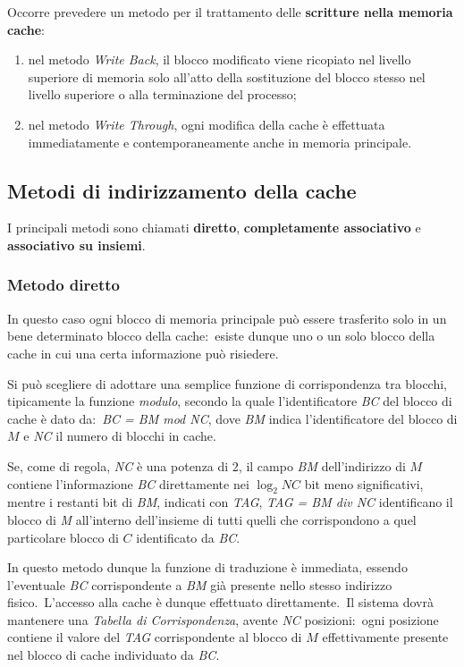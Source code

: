 Occorre prevedere un metodo per il trattamento delle \textbf{scritture nella memoria cache}:

\begin{enumerate}
    \item nel metodo\textit{ Write Back}, il blocco modificato viene ricopiato nel livello superiore di memoria solo all'atto della sostituzione del blocco stesso nel livello superiore o alla terminazione del processo;
    \item nel metodo \textit{Write Through}, ogni modifica della cache è effettuata immediatamente e contemporaneamente anche in memoria principale.
\end{enumerate}

\subsection{Metodi di indirizzamento della cache}

I principali metodi sono chiamati \textbf{diretto}, \textbf{completamente associativo} e \textbf{associativo su insiemi}.

\subsubsection{Metodo diretto}

In questo caso ogni blocco di memoria principale può essere trasferito solo in un bene determinato blocco della cache:\ esiste dunque uno o un solo blocco della cache in cui una certa informazione può risiedere.

Si può scegliere di adottare una semplice funzione di corrispondenza tra blocchi, tipicamente la funzione \textit{modulo}, secondo la quale l'identificatore \textit{BC} del blocco di cache è dato da:\ \textit{BC = BM mod NC}, dove \textit{BM} indica l'identificatore del blocco di $M$ e \textit{NC} il numero di blocchi in cache.

Se, come di regola, \textit{NC} è una potenza di 2, il campo \textit{BM} dell'indirizzo di $M$ contiene l'informazione \textit{BC} direttamente nei $\log_2NC$ bit meno significativi, mentre i restanti bit di \textit{BM}, indicati con \textit{TAG}, \textit{TAG = BM div NC} identificano il blocco di \textit{M} all'interno dell'insieme di tutti quelli che corrispondono a quel particolare blocco di $C$ identificato da \textit{BC}.

In questo metodo dunque la funzione di traduzione è immediata, essendo l'eventuale \textit{BC} corrispondente a \textit{BM} già presente nello stesso indirizzo fisico.\
L'accesso alla cache è dunque effettuato direttamente.\
Il sistema dovrà mantenere una \textit{Tabella di Corrispondenza}, avente \textit{NC} posizioni:\ ogni posizione contiene il valore del \textit{TAG} corrispondente al blocco di $M$ effettivamente presente nel blocco di cache individuato da \textit{BC}.

